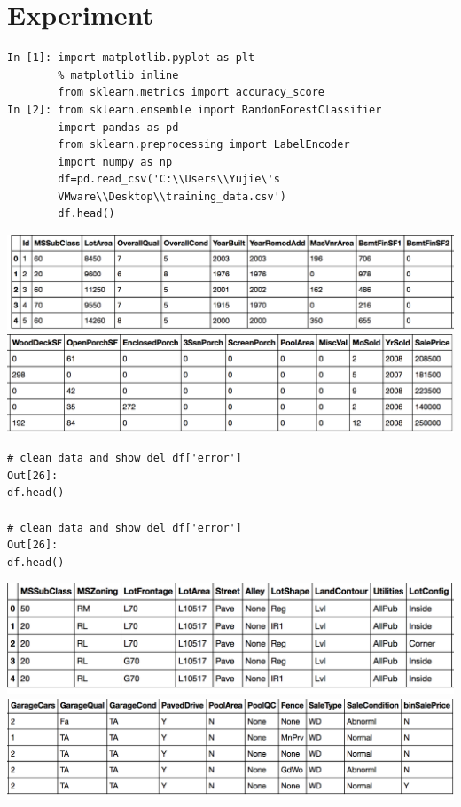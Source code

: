 \documentclass[sigconf]{acmart}
\begin{document}
\section{Experiment}
\begin{lstlisting}
In [1]: import matplotlib.pyplot as plt
        % matplotlib inline
        from sklearn.metrics import accuracy_score
In [2]: from sklearn.ensemble import RandomForestClassifier
        import pandas as pd
        from sklearn.preprocessing import LabelEncoder
        import numpy as np
        df=pd.read_csv('C:\\Users\\Yujie\'s
        VMware\\Desktop\\training_data.csv')
        df.head()
\end{lstlisting}
\includegraphics[width=0.95\columnwidth]{3}
\\
\includegraphics[width=0.95\columnwidth]{4}

\begin{lstlisting}
# clean data and show del df['error']
Out[26]:
df.head()

# clean data and show del df['error']
Out[26]:
df.head()
\end{lstlisting}
\includegraphics[width=0.95\columnwidth]{1}
\\
\includegraphics[width=0.95\columnwidth]{2}
\end{document}
